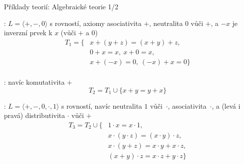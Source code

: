 \documentclass{beamer}
\begin{document}
\begin{frame}{Příklady teorií: Algebraické teorie 1/2}

    \pause
    : $L=\langle +,-,0\rangle$ s rovností, axiomy 
    \alert{asociativita $+$}, \alert{neutralita $0$ vůči $+$}, a \alert{$-x$ je inverzní prvek k $x$ (vůči $+$ a $0$)}
    \pause
    {\small
    \begin{align*}
        T_1=\{& x + (y + z) = (x + y) + z,\\
            & 0 + x = x,\ x + 0 = x,\\
            & x + (-x) = 0,\ (-x) + x = 0\}\\
    \end{align*}
    }
   
    \vspace{-24pt}

    \pause
    : navíc \alert{komutativita $+$} 
    \pause
    {\small
    $$
    T_2=T_1\cup\{x+y=y+x\}
    $$
    }

    \vspace{-6pt}

    \pause
    : $L=\langle +,-,0,\cdot,1\rangle$ s rovností, navíc \alert{neutralita $1$ vůči~$\cdot$}, \alert{asociativita~$\cdot$}, a \alert{(levá i pravá) distributivita $\cdot$ vůči $+$}
    \pause
    {\small
    \begin{align*}
        T_3=T_2\cup\{   & 1 \cdot x = x \cdot 1,\\
        & x \cdot (y \cdot z) = (x \cdot y) \cdot z,\\
        & x \cdot (y + z) = x \cdot y + x \cdot z,\\
        & (x + y) \cdot z = x \cdot z + y \cdot z\}
    \end{align*}
    }
\end{frame}
    
\end{document}
